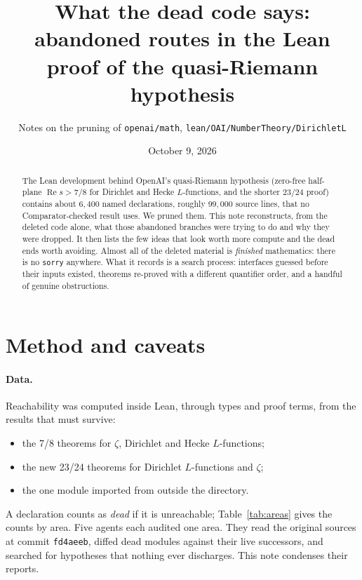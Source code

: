 \documentclass[11pt,a4paper]{article}
\title{What the dead code says:\\ abandoned routes in the Lean proof of the quasi-Riemann hypothesis}
\author{Notes on the pruning of \texttt{openai/math}, \texttt{lean/OAI/NumberTheory/DirichletL}}
\date{October 9, 2026}
\newcommand{\lean}[1]{\nolinkurl{#1}}
\newcommand{\Rea}{\operatorname{Re}}
\begin{document}
\maketitle

\begin{abstract}
The Lean development behind OpenAI's quasi-Riemann hypothesis (zero-free half-plane
$\Rea s>7/8$ for Dirichlet and Hecke $L$-functions, and the shorter $23/24$ proof) contains about
$6{,}400$ named declarations, roughly $99{,}000$ source lines, that no Comparator-checked result
uses. We pruned them. This note reconstructs, from the deleted code alone, what those abandoned
branches were trying to do and why they were dropped. It then lists the few ideas that look worth
more compute and the dead ends worth avoiding. Almost all of the deleted material is \emph{finished}
mathematics: there is no \lean{sorry} anywhere. What it records is a search process: interfaces
guessed before their inputs existed, theorems re-proved with a different quantifier order, and a
handful of genuine obstructions.
\end{abstract}

\section{Method and caveats}

\paragraph{Data.} Reachability was computed inside Lean, through types and proof terms, from the
results that must survive:
\begin{itemize}
\item the 7/8 theorems for $\zeta$, Dirichlet and Hecke $L$-functions;
\item the new 23/24 theorems for Dirichlet $L$-functions and $\zeta$;
\item the one module imported from outside the directory.
\end{itemize}
A declaration counts as \emph{dead} if it is unreachable; Table~\ref{tab:areas} gives the counts by
area. Five agents each audited one area. They read the original sources at commit \texttt{fd4aeeb},
diffed dead modules against their live successors, and searched for hypotheses that nothing ever
discharges. This note condenses their reports.
\end{document}
